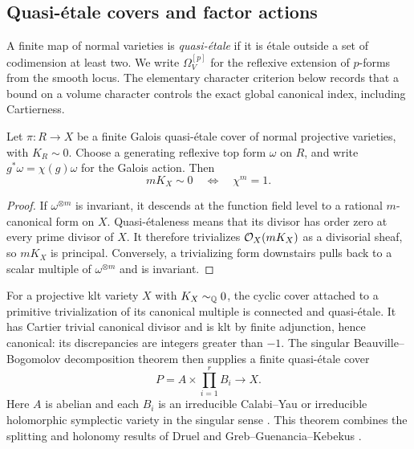 \subsection{Quasi-\'etale covers and factor actions}

A finite map of normal varieties is \emph{quasi-\'etale} if it is
\'etale outside a set of codimension at least two. We write
$\Omega_V^{[p]}$ for the reflexive extension of $p$-forms from the
smooth locus. The elementary character criterion below records
that a bound on a volume character controls the exact global
canonical index, including Cartierness.

\begin{lemma}\label{lem:index-character}
Let $\pi:R\to X$ be a finite Galois quasi-\'etale cover of normal
projective varieties, with $K_R\sim0$. Choose a generating reflexive
top form $\omega$ on $R$, and write
$g^*\omega=\chi(g)\omega$ for the Galois action. Then
\[
                       mK_X\sim0\quad\Longleftrightarrow\quad\chi^m=1.
\]
\end{lemma}

\begin{proof}
If $\omega^{\otimes m}$ is invariant, it descends at the function
field level to a rational $m$-canonical form on $X$. Quasi-\'etaleness
means that its divisor has order zero at every prime divisor of
$X$. It therefore trivializes $\mathcal O_X(mK_X)$ as a divisorial sheaf,
so $mK_X$ is principal. Conversely, a trivializing form downstairs
pulls back to a scalar multiple of $\omega^{\otimes m}$ and is
invariant.
\end{proof}

For a projective klt variety $X$ with $K_X\sim_{\mathbb Q}0$, the cyclic
cover attached to a primitive trivialization of its canonical
multiple is connected and quasi-\'etale. It has Cartier trivial
canonical divisor and is klt by finite adjunction, hence canonical:
its discrepancies are integers greater than $-1$. The singular
Beauville--Bogomolov decomposition theorem then supplies a finite
quasi-\'etale cover
\begin{equation}\label{eq:index-product-cover}
                 P=A\times\prod_{i=1}^r B_i\longrightarrow X.
\end{equation}
Here $A$ is abelian and each $B_i$ is an irreducible Calabi--Yau or
irreducible holomorphic symplectic variety in the singular sense
\cite[Definition~1.4 and Theorem~1.5]{HoringPeternell2019}. This theorem combines
the splitting and holonomy results of Druel and
Greb--Guenancia--Kebekus \cite{Druel2018,GGK2019}.

